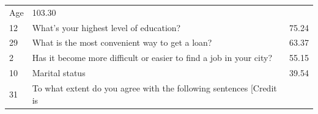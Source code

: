 \begin{longtable}[]{@{}lll@{}}
\begin{minipage}[t]{0.77\columnwidth}
Age\strut
\end{minipage} & \begin{minipage}[t]{0.09\columnwidth}\raggedright
103.30\strut
\end{minipage}\tabularnewline
\begin{minipage}[t]{0.05\columnwidth}\raggedright
12\strut
\end{minipage} & \begin{minipage}[t]{0.77\columnwidth}\raggedright
What's your highest level of education?\strut
\end{minipage} & \begin{minipage}[t]{0.09\columnwidth}\raggedright
75.24\strut
\end{minipage}\tabularnewline
\begin{minipage}[t]{0.05\columnwidth}\raggedright
29\strut
\end{minipage} & \begin{minipage}[t]{0.77\columnwidth}\raggedright
What is the most convenient way to get a loan?\strut
\end{minipage} & \begin{minipage}[t]{0.09\columnwidth}\raggedright
63.37\strut
\end{minipage}\tabularnewline
\begin{minipage}[t]{0.05\columnwidth}\raggedright
2\strut
\end{minipage} & \begin{minipage}[t]{0.77\columnwidth}\raggedright
Has it become more difficult or easier to find a job in your city?\strut
\end{minipage} & \begin{minipage}[t]{0.09\columnwidth}\raggedright
55.15\strut
\end{minipage}\tabularnewline
\begin{minipage}[t]{0.05\columnwidth}\raggedright
10\strut
\end{minipage} & \begin{minipage}[t]{0.77\columnwidth}\raggedright
Marital status\strut
\end{minipage} & \begin{minipage}[t]{0.09\columnwidth}\raggedright
39.54\strut
\end{minipage}\tabularnewline
\begin{minipage}[t]{0.05\columnwidth}\raggedright
31\strut
\end{minipage} & \begin{minipage}[t]{0.77\columnwidth}\raggedright
To what extent do you agree with the following sentences {[}Credit is

\end{minipage}
\end{longtable}
